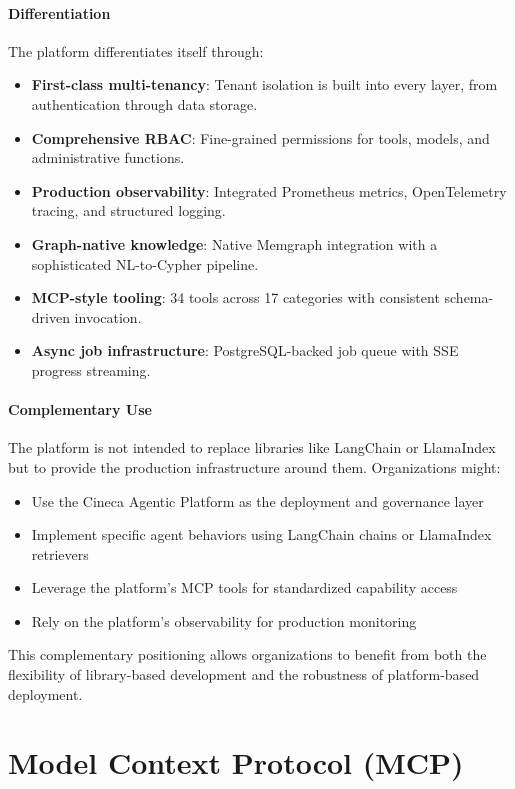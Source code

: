 \documentclass[a4paper,twoside]{sapthesis}
\begin{document}
\paragraph{Differentiation}
The platform differentiates itself through:
\begin{itemize}
    \item \textbf{First-class multi-tenancy}: Tenant isolation is built into every layer, from authentication through data storage.
    \item \textbf{Comprehensive RBAC}: Fine-grained permissions for tools, models, and administrative functions.
    \item \textbf{Production observability}: Integrated Prometheus metrics, OpenTelemetry tracing, and structured logging.
    \item \textbf{Graph-native knowledge}: Native Memgraph integration with a sophisticated NL-to-Cypher pipeline.
    \item \textbf{MCP-style tooling}: 34 tools across 17 categories with consistent schema-driven invocation.
    \item \textbf{Async job infrastructure}: PostgreSQL-backed job queue with SSE progress streaming.
\end{itemize}

\paragraph{Complementary Use}
The platform is not intended to replace libraries like LangChain or LlamaIndex but to provide the production infrastructure around them. Organizations might:
\begin{itemize}
    \item Use the Cineca Agentic Platform as the deployment and governance layer
    \item Implement specific agent behaviors using LangChain chains or LlamaIndex retrievers
    \item Leverage the platform's MCP tools for standardized capability access
    \item Rely on the platform's observability for production monitoring
\end{itemize}

This complementary positioning allows organizations to benefit from both the flexibility of library-based development and the robustness of platform-based deployment.

\section{Model Context Protocol (MCP)}
\label{sec:mcp-background}
\end{document}
